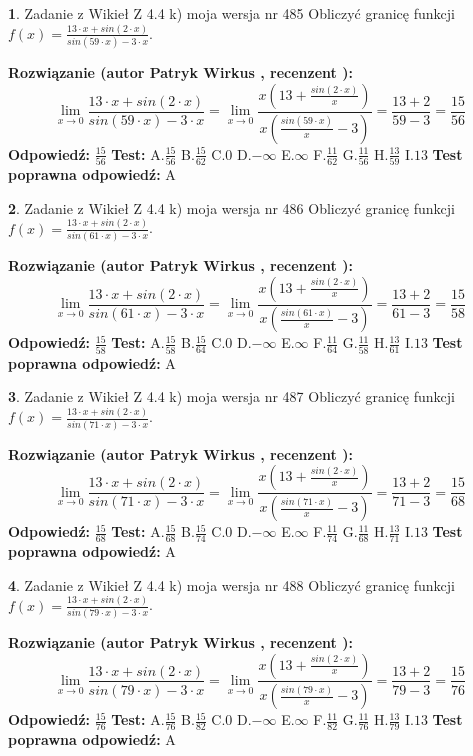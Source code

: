 \documentclass[12pt, a4paper]{article}
\theoremstyle{definition} %
\newtheorem{zad}{}
\newcommand{\zadStart}[1]{\begin{zad}#1\newline}
\newcommand{\zadStop}{\end{zad}}
\newcommand{\rozwStart}[2]{\noindent \textbf{Rozwiązanie (autor #1 , recenzent #2): }\newline}
\newcommand{\rozwStop}{\newline}
\newcommand{\odpStart}{\noindent \textbf{Odpowiedź:}\newline}
\newcommand{\odpStop}{\newline}
\newcommand{\testStart}{\noindent \textbf{Test:}\newline}
\newcommand{\testStop}{\newline}
\newcommand{\kluczStart}{\noindent \textbf{Test poprawna odpowiedź:}\newline}
\newcommand{\kluczStop}{\newline}
\begin{document}
\zadStart{Zadanie z Wikieł Z 4.4 k) moja wersja nr 485}
Obliczyć granicę funkcji $f(x)=\frac{13\cdot x +sin(2\cdot x)}{sin(59\cdot x) -3\cdot x}$.
\zadStop
\rozwStart{Patryk Wirkus}{}
$$\lim\limits_{x\to 0}\frac{13\cdot x +sin(2\cdot x)}{sin(59\cdot x) -3\cdot x}
=\lim\limits_{x\to 0}\frac{x(13+\frac{sin(2\cdot x)}{x})}{x(\frac{sin(59\cdot x)}{x}-3)}
=\frac{13+2}{59-3} = \frac{15}{56}$$
\rozwStop
\odpStart
$\frac{15}{56}$
\odpStop
\testStart
A.$\frac{15}{56}$
B.$\frac{15}{62}$
C.$0$
D.$-\infty$
E.$\infty$
F.$\frac{11}{62}$
G.$\frac{11}{56}$
H.$\frac{13}{59}$
I.$13$
\testStop
\kluczStart
A
\kluczStop



\zadStart{Zadanie z Wikieł Z 4.4 k) moja wersja nr 486}
Obliczyć granicę funkcji $f(x)=\frac{13\cdot x +sin(2\cdot x)}{sin(61\cdot x) -3\cdot x}$.
\zadStop
\rozwStart{Patryk Wirkus}{}
$$\lim\limits_{x\to 0}\frac{13\cdot x +sin(2\cdot x)}{sin(61\cdot x) -3\cdot x}
=\lim\limits_{x\to 0}\frac{x(13+\frac{sin(2\cdot x)}{x})}{x(\frac{sin(61\cdot x)}{x}-3)}
=\frac{13+2}{61-3} = \frac{15}{58}$$
\rozwStop
\odpStart
$\frac{15}{58}$
\odpStop
\testStart
A.$\frac{15}{58}$
B.$\frac{15}{64}$
C.$0$
D.$-\infty$
E.$\infty$
F.$\frac{11}{64}$
G.$\frac{11}{58}$
H.$\frac{13}{61}$
I.$13$
\testStop
\kluczStart
A
\kluczStop



\zadStart{Zadanie z Wikieł Z 4.4 k) moja wersja nr 487}
Obliczyć granicę funkcji $f(x)=\frac{13\cdot x +sin(2\cdot x)}{sin(71\cdot x) -3\cdot x}$.
\zadStop
\rozwStart{Patryk Wirkus}{}
$$\lim\limits_{x\to 0}\frac{13\cdot x +sin(2\cdot x)}{sin(71\cdot x) -3\cdot x}
=\lim\limits_{x\to 0}\frac{x(13+\frac{sin(2\cdot x)}{x})}{x(\frac{sin(71\cdot x)}{x}-3)}
=\frac{13+2}{71-3} = \frac{15}{68}$$
\rozwStop
\odpStart
$\frac{15}{68}$
\odpStop
\testStart
A.$\frac{15}{68}$
B.$\frac{15}{74}$
C.$0$
D.$-\infty$
E.$\infty$
F.$\frac{11}{74}$
G.$\frac{11}{68}$
H.$\frac{13}{71}$
I.$13$
\testStop
\kluczStart
A
\kluczStop



\zadStart{Zadanie z Wikieł Z 4.4 k) moja wersja nr 488}
Obliczyć granicę funkcji $f(x)=\frac{13\cdot x +sin(2\cdot x)}{sin(79\cdot x) -3\cdot x}$.
\zadStop
\rozwStart{Patryk Wirkus}{}
$$\lim\limits_{x\to 0}\frac{13\cdot x +sin(2\cdot x)}{sin(79\cdot x) -3\cdot x}
=\lim\limits_{x\to 0}\frac{x(13+\frac{sin(2\cdot x)}{x})}{x(\frac{sin(79\cdot x)}{x}-3)}
=\frac{13+2}{79-3} = \frac{15}{76}$$
\rozwStop
\odpStart
$\frac{15}{76}$
\odpStop
\testStart
A.$\frac{15}{76}$
B.$\frac{15}{82}$
C.$0$
D.$-\infty$
E.$\infty$
F.$\frac{11}{82}$
G.$\frac{11}{76}$
H.$\frac{13}{79}$
I.$13$
\testStop
\kluczStart
A
\kluczStop
\end{document}
